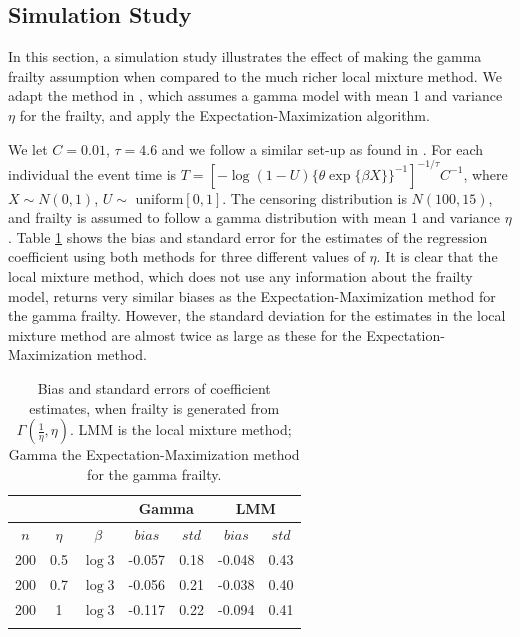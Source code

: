 \documentclass[graybox]{svmult}
\begin{document}
\subsection{Simulation Study}\label{Simulation}
In this section, a simulation study  illustrates  the  effect of making  the    gamma frailty assumption  when compared to the much richer  local mixture
method. We adapt the method in \cite{Klein1992}, which assumes a gamma model with mean
1 and variance $\eta$ for the frailty, and apply the Expectation-Maximization algorithm.

We let $C=0.01$, $\tau=4.6$ and we follow a similar set-up as found in \cite{Hsu2004}. For each individual
the event time is $T=[ -\log(1-U) \{  \theta \exp\{\beta X\} \}^{-1}] ^{-1/\tau} C^{-1}$, where
$X\sim N(0,1)$, $U\sim$ uniform$[0,1]$. The censoring distribution is $N(100,15)$, and frailty
is assumed to follow a gamma distribution with mean 1 and variance $\eta$. Table \ref{simulLMMnew}
shows the bias and standard error for the estimates of the regression coefficient using both
methods for three different values of $\eta$. It is clear that the local mixture method, which
does not use any information about the frailty model, returns very similar biases as the Expectation-Maximization method for the gamma frailty. However, the standard deviation for the estimates in the local mixture method are almost twice as large as these
for the Expectation-Maximization method.  

\begin{table}[h!]
\caption{Bias and standard errors of coefficient estimates, when frailty 
is generated from $\Gamma(\frac{1}{\eta},\eta)$. LMM is the local mixture method; Gamma the 
Expectation-Maximization method for the gamma frailty.}
\label{simulLMMnew}
\begin{center}
\begin{tabular}{c c c c c c c}

\hline  
& & &\multicolumn{2}{c}{Gamma } & \multicolumn{2}{c}{LMM}\\ [0.3ex]
\hline
$n$ & $\eta$ & $\beta$ &  $bias$ & $std$ & $bias$ & $std$ \\ [0.3ex] 
\hline 
200 & 0.5&  $\log{3}$ & -0.057  & 0.18 & -0.048 & 0.43 \\ 
200 & 0.7&  $\log{3}$ & -0.056  & 0.21 & -0.038 & 0.40 \\ 
200 & 1&  $\log{3}$ & -0.117  & 0.22 & -0.094 & 0.41 \\ 
\hline\\
\end{tabular}
\end{center}
\end{table}
\end{document}
